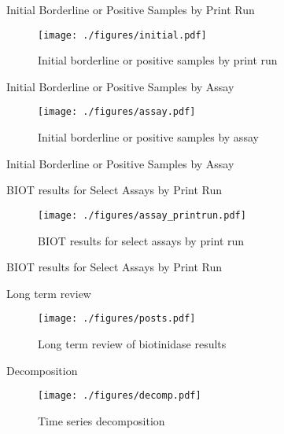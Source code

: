\documentclass[presentation, smaller]{beamer}
\begin{document}
\begin{frame}[label={sec:orgheadline16}]{Initial Borderline or Positive Samples by Print Run}
\begin{figure}[htb]
\centering
\texttt{[image: ./figures/initial.pdf]}
\caption{\label{fig:initial}
Initial borderline or positive samples by print run}
\end{figure}
\end{frame}


\begin{frame}[label={sec:orgheadline17}]{Initial Borderline or Positive Samples by Assay}
\begin{figure}[htb]
\centering
\texttt{[image: ./figures/assay.pdf]}
\caption{\label{fig:assay}
Initial borderline or positive samples by assay}
\end{figure}
\end{frame}

\begin{frame}[label={sec:orgheadline18}]{Initial Borderline or Positive Samples by Assay}

\end{frame}


\begin{frame}[label={sec:orgheadline19}]{BIOT results for Select Assays by Print Run}
\begin{figure}[htb]
\centering
\texttt{[image: ./figures/assay\_printrun.pdf]}
\caption{\label{fig:run}
BIOT results for select assays by print run}
\end{figure}
\end{frame}

\begin{frame}[label={sec:orgheadline20}]{BIOT results for Select Assays by Print Run}

\end{frame}

\begin{frame}[label={sec:orgheadline21}]{Long term review}
\begin{figure}[htb]
\centering
\texttt{[image: ./figures/posts.pdf]}
\caption{\label{fig:ts}
Long term review of biotinidase results}
\end{figure}
\end{frame}


\begin{frame}[label={sec:orgheadline22}]{Decomposition}
\begin{figure}[htb]
\centering
\texttt{[image: ./figures/decomp.pdf]}
\caption{\label{fig:decomp}
Time series decomposition}
\end{figure}
\end{frame}
\end{document}
